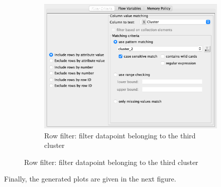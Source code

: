 \documentclass[11pt]{article}
\begin{document}
\begin{figure}[H]
\begin{subfigure}{0.4\textwidth}
					\includegraphics[width=\textwidth]{res/t1/t14/t14-row-filter-3-conf}
					\caption{Row filter: filter datapoint belonging to the third cluster}
					\label{fig:third}
				\end{subfigure}	
				\label{fig:figures}
			\end{figure}
			\fi
			Finally, the generated plots are given in the next figure.
			\iftrue
\end{document}
